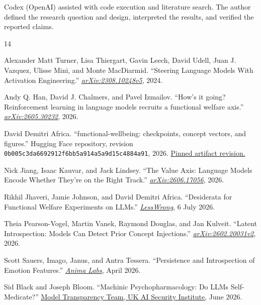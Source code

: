 \documentclass[10pt,twocolumn]{article}
\begin{document}
Codex (OpenAI) assisted with code execution and literature search. The author defined the research question and design, interpreted the results, and verified the reported claims.

\begin{thebibliography}{14}
\footnotesize
\setlength{\itemsep}{0.15em}
\setlength{\parsep}{0pt}

Alexander Matt Turner, Lisa Thiergart, Gavin Leech, David Udell, Juan J. Vazquez, Ulisse Mini, and Monte MacDiarmid.
``Steering Language Models With Activation Engineering.''
\href{https://arxiv.org/abs/2308.10248}{\emph{arXiv:2308.10248v5}}, 2024.

Andy Q. Han, David J. Chalmers, and Pavel Izmailov.
``How's it going? Reinforcement learning in language models recruits a functional welfare axis.''
\href{https://arxiv.org/abs/2605.30232}{\emph{arXiv:2605.30232}}, 2026.

David Demitri Africa.
``functional-wellbeing: checkpoints, concept vectors, and figures.''
Hugging Face repository, revision \nolinkurl{0b005c3da6692912f6bb5a914a5a9d15c4884a91}, 2026.
\href{https://huggingface.co/davidafrica/functional-wellbeing/tree/0b005c3da6692912f6bb5a914a5a9d15c4884a91}{Pinned artifact revision.}

Nick Jiang, Isaac Kauvar, and Jack Lindsey.
``The Value Axis: Language Models Encode Whether They're on the Right Track.''
\href{https://arxiv.org/abs/2606.17056}{\emph{arXiv:2606.17056}}, 2026.

Rikhil Jhaveri, Jamie Johnson, and David Demitri Africa.
``Desiderata for Functional Welfare Experiments on LLMs.''
\href{https://www.lesswrong.com/posts/yku6byxdeKREibe5L/desiderata-for-functional-welfare-experiments-on-llms}{\emph{LessWrong}}, 6 July 2026.

Theia Pearson-Vogel, Martin Vanek, Raymond Douglas, and Jan Kulveit.
``Latent Introspection: Models Can Detect Prior Concept Injections.''
\href{https://arxiv.org/abs/2602.20031}{\emph{arXiv:2602.20031v2}}, 2026.

Scott Sauers, Imago, Janus, and Antra Tessera.
``Persistence and Introspection of Emotion Features.''
\href{https://latentaffect.up.railway.app/long_range_persistence_of_emotion_features.html}{\emph{Anima Labs}}, April 2026.

Sid Black and Joseph Bloom.
``Machinic Psychopharmacology: Do LLMs Self-Medicate?''
\href{https://www.lesswrong.com/posts/cNDJuXNZ8MrkPZNzj/machinic-psychopharmacology-do-llms-self-medicate-3}{Model Transparency Team, UK AI Security Institute}, June 2026.


\end{thebibliography}
\end{document}
